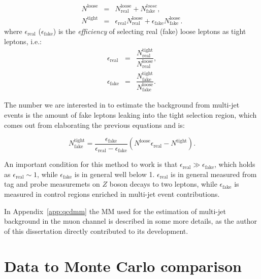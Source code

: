 \begin{eqnarray}
\label{eqn:intro-mm-Nloose}
N^\mathrm{loose} & = & N^\mathrm{loose}_\mathrm{real} + N^{loose}_\mathrm{fake}, \\
\label{eqn:intro-mm-Ntight}
N^\mathrm{tight} & = & \epsilon_\mathrm{real}N^\mathrm{loose}_\mathrm{real} + \epsilon_\mathrm{fake}N^\mathrm{loose}_\mathrm{fake}.
\end{eqnarray}
where $\epsilon_\mathrm{real}$ ($\epsilon_\mathrm{fake}$) is the 
{\it efficiency} of selecting real (fake) loose leptons as tight leptons, i.e.:
\begin{eqnarray}
\label{eqn:intro-mm-real}
\epsilon_\mathrm{real} & = & \dfrac{N^\mathrm{tight}_\mathrm{real}}{N^\mathrm{loose}_\mathrm{real}}, \\
\label{eqn:intro-mm-fake}
\epsilon_\mathrm{fake} & = & \dfrac{N^\mathrm{tight}_\mathrm{fake}}{N^\mathrm{loose}_\mathrm{fake}}.
\end{eqnarray}


The number we are interested in to estimate the background from
multi-jet events is the amount of fake leptons leaking into the 
tight selection region, which comes out from elaborating
the previous equations and is:

\begin{equation}
N^\mathrm{tight}_\mathrm{fake} = \frac{\epsilon_\mathrm{fake}}{\epsilon_\mathrm{real} - \epsilon_\mathrm{fake}}(N^\mathrm{loose} \epsilon_\mathrm{real} - N^\mathrm{tight}).
\label{eqn:intro-mm-tight_fake}
\end{equation}

An important condition for this method to work is that 
$\epsilon_\mathrm{real} \gg \epsilon_\mathrm{fake}$, which 
holds as $\epsilon_\mathrm{real}\sim 1$, while $\epsilon_\mathrm{fake}$
is in general well below 1.
$\epsilon_\mathrm{real}$ is in general measured from
tag and probe measuremets on $Z$ boson decays to two leptons,
while $\epsilon_\mathrm{fake}$ is measured in control regions
enriched in multi-jet event contributions.

In Appendix~\ref{app:qcdmm} the MM used for the estimation
of multi-jet background in the muon channel is
described in some more details, as the author of this dissertation
directly contributed to its development.


\section{Data to Monte Carlo comparison}\label{sec:datamcpresel}


